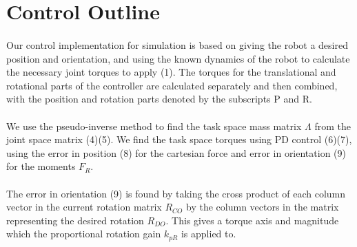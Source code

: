 \documentclass[10pt,a4paper,notitlepage]{report}
\begin{document}
\section*{Control Outline}
\paragraph*{}
Our control implementation for simulation is based on giving the robot a desired position
and orientation, and using the known dynamics of the robot to calculate the necessary joint torques
to apply (1). The torques for the translational and rotational parts of the controller
are calculated separately and then combined, with the position and rotation parts denoted
by the subscripts P and R. 
\paragraph*{} 
We use the pseudo-inverse method to 
find the task space mass matrix $\Lambda$
from the joint space matrix (4)(5). We find the task space torques using PD control (6)(7), 
using the error in position (8) for the cartesian force and error in orientation (9) 
for the moments $F_{R}$. 
\paragraph*{}

The error in orientation (9) is found by taking the cross product of each column vector in the 
current rotation matrix $R_{CO}$ by the column vectors in the matrix 
representing the desired rotation $R_{DO}$. This gives a torque axis and magnitude which the proportional rotation gain $k_{pR}$ is applied to.

     
\end{document}
